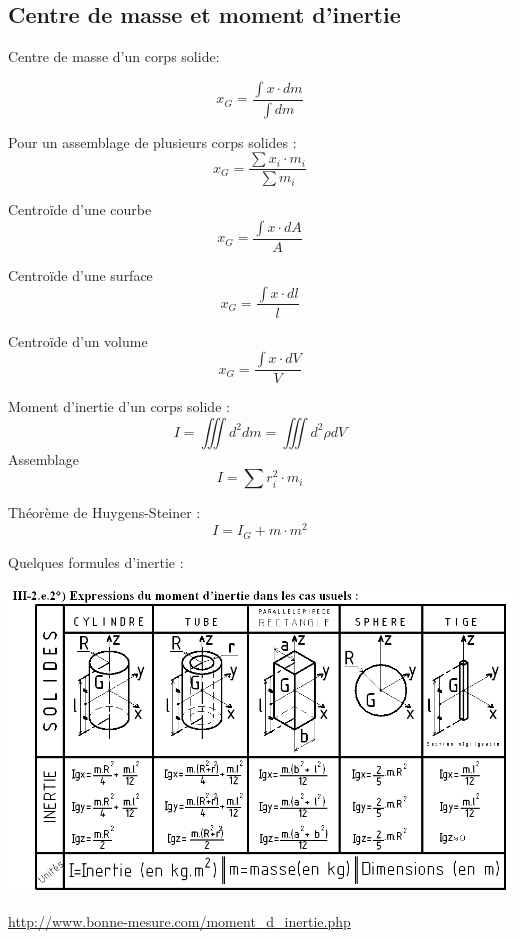 \documentclass[12pt,a4paper,twoside]{article}
\numberwithin{equation}{subsection}
\begin{document}
\subsection{Centre de masse et moment d'inertie}
Centre de masse d'un corps solide:

\begin{equation}
x_G=\frac{\int x \cdot dm}{\int dm}
\end{equation}

Pour un assemblage de plusieurs corps solides :
\begin{equation}
x_G=\frac{\sum x_i \cdot m_i}{\sum m_i}
\end{equation}

Centroïde d'une courbe
\begin{equation}
x_G=\frac{\int x \cdot dA}{A}
\end{equation}

Centroïde d'une surface 
\begin{equation}
x_G=\frac{\int x \cdot dl}{l}
\end{equation}

Centroïde d'un volume
\begin{equation}
x_G=\frac{\int x \cdot dV}{V}
\end{equation}

Moment d'inertie d'un corps solide : 
\begin{equation}
I=\iiint d^2 dm=\iiint d^2 \rho dV
\end{equation}
Assemblage 
\begin{equation}
I=\sum r_i^2 \cdot m_i
\end{equation}

Théorème de Huygens-Steiner : 
\begin{equation}
I=I_G+m\cdot m^2
\end{equation}

Quelques formules d'inertie : \\
\begin{center}
\includegraphics[scale=0.65]{MomentDinerties.png}
\end{center}
\url{http://www.bonne-mesure.com/moment_d_inertie.php}\\
\end{document}
